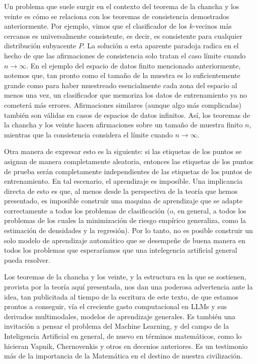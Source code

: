 \documentclass{report}
\begin{document}
Un problema que suele surgir en el contexto del teorema de la chancha y los veinte es cómo se relaciona con los
teoremas de consistencia demostrados anteriormente. Por ejemplo, vimos que el clasificador
de los \(k\)-vecinos más cercanos es universalmente consistente, es decir, es consistente para cualquier
distribución subyacente \(P\). La solución a esta aparente paradoja radica en el hecho de que las afirmaciones de consistencia solo tratan
el caso límite cuando \(n \to \infty\). En el ejemplo del espacio de datos finito mencionado anteriormente,
notemos que, tan pronto como el tamaño de la muestra es lo suficientemente grande como para haber muestreado
esencialmente cada zona del espacio al menos una vez, un clasificador que memoriza los datos de entrenamiento
ya no cometerá más errores. Afirmaciones similares (aunque algo más complicadas) también son válidas en casos
de espacios de datos infinitos. Así, los teoremas de la chancha y los veinte hacen afirmaciones sobre un tamaño de muestra finito \(n\), mientras que
la consistencia considera el límite cuando \(n \to \infty\).

Otra manera de expresar esto es la siguiente: si las etiquetas de los puntos se asignan de manera
completamente aleatoria, entonces las etiquetas de los puntos de prueba serán completamente independientes
de las etiquetas de los puntos de entrenamiento. En tal escenario, el aprendizaje es imposible. Una implicancia
directa de esto es que, al menos desde la perspectiva de la teoría que hemos presentado, es imposible construir
una maquina de aprendizaje que se adapte correctamente a todos los problemas de clasificación (o, en general,
a todos los problemas de los cuales la minimización de riesgo empírico generaliza, como la estimación de densidades
y la regresión). Por lo tanto, no es posible construir un solo modelo de aprendizaje automático que se desempeñe
de buena manera en todos los problemas que esperaríamos que una intelegencia artificial general pueda resolver.

Los
teoremas de la chancha y los veinte, y la estructura en la que se sostienen, provista por la teoría aquí presentada,
nos dan una poderosa advertencia ante la idea, tan publicitada al tiempo de la escritura de este texto, de que estamos
prontos a conseguir, vía el creciente gasto computacional en LLMs y sus derivados multimodales, modelos de aprendizaje
generales. Es también una invitación a pensar el problema del Machine Learning, y del campo de la Inteligencia Artificial
en general, de nuevo en términos matemáticos, como lo hicieran Vapnik, Chernovenkis y otros en decenios anteriores. Es un
testimonio más de la importancia de la Matemática en el destino de nuestra civilización.




\nocite{*}
\printbibliography[title={Bibliografía}]
\end{document}
